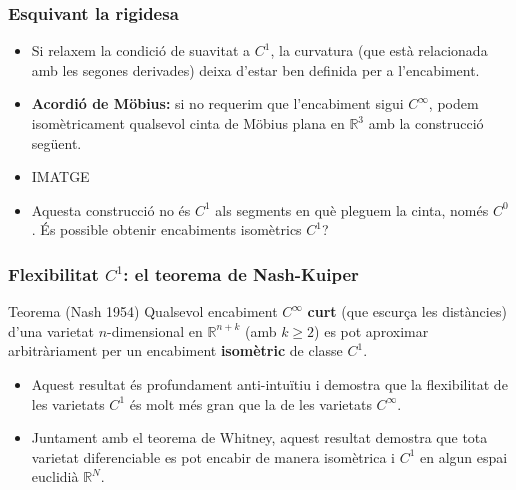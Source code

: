 \documentclass[aspectratio=169]{beamer}
\begin{document}
\begin{frame}
    \frametitle{Esquivant la rigidesa}
    
    \begin{itemize}
      \item<1-> Si relaxem la condició de suavitat a $C^1$, la curvatura (que està relacionada amb les segones derivades) deixa d'estar ben definida per a l'encabiment. 
      \item<2-> \textbf{Acordió de Möbius:} si no requerim que l'encabiment sigui $C^\infty$, podem  isomètricament qualsevol cinta de Möbius plana en $\mathbb R^3$ amb la construcció següent.
      \item<2-> IMATGE
      \item<3-> Aquesta construcció no és $C^1$ als segments en què pleguem la cinta, només $C^0$. És possible obtenir encabiments isomètrics $C^1$?
    \end{itemize}
  \end{frame}

\begin{frame}
  \frametitle{Flexibilitat $C^1$: el teorema de Nash-Kuiper}
  
  \begin{block}{Teorema (Nash 1954)}
    Qualsevol encabiment $C^\infty$ \textbf{curt} (que escurça les distàncies) d'una varietat $n$-dimensional en $\mathbb{R}^{n+k}$ (amb $k \geq 2$) es pot aproximar arbitràriament per un encabiment \textbf{isomètric} de classe $C^1$. 
  \end{block}
  
  \begin{itemize}
    \item<1-> Aquest resultat és profundament anti-intuïtiu i demostra que la flexibilitat de les varietats $C^1$ és molt més gran que la de les varietats $C^\infty$. 
    \item<2-> Juntament amb el teorema de Whitney, aquest resultat demostra que tota varietat diferenciable es pot encabir de manera isomètrica i $C^1$ en algun espai euclidià $\mathbb{R}^{N}$.
  \end{itemize}
\end{frame}
\end{document}
